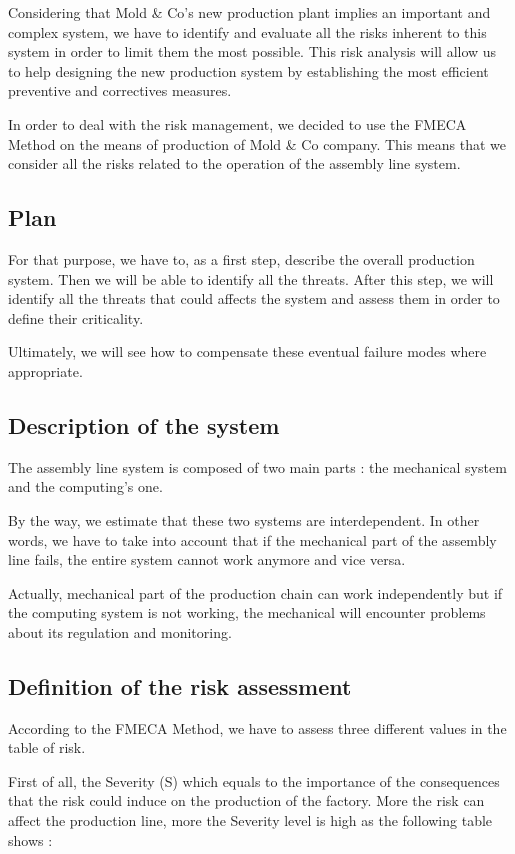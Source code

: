 Considering that Mold \& Co's new production plant implies an important
and complex system, we have to identify and evaluate all the risks
inherent to this system in order to limit them the most possible. This
risk analysis will allow us to help designing the new production system
by establishing the most efficient preventive and correctives measures.

In order to deal with the risk management, we decided to use the FMECA
Method on the means of production of Mold \& Co company. This means that
we consider all the risks related to the operation of the assembly line
system.

\subsection{Plan}

For that purpose, we have to, as a first step, describe the overall
production system. Then we will be able to identify all the threats.
After this step, we will identify all the threats that could affects the
system and assess them in order to define their criticality.

Ultimately, we will see how to compensate these eventual failure modes
where appropriate.

\subsection{Description of the system}

The assembly line system is composed of two main parts : the mechanical
system and the computing's one.

By the way, we estimate that these two systems are interdependent. In
other words, we have to take into account that if the mechanical part of
the assembly line fails, the entire system cannot work anymore and vice
versa.

Actually, mechanical part of the production chain can work independently
but if the computing system is not working, the mechanical will
encounter problems about its regulation and monitoring.

\subsection{Definition of the risk assessment}

According to the FMECA Method, we have to assess three different values
in the table of risk.

First of all, the Severity (S) which equals to the importance of the
consequences that the risk could induce on the production of the
factory. More the risk can affect the production line, more the Severity
level is high as the following table shows :

